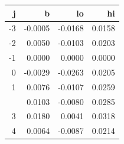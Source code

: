 
\begin{tabular}{rrrr}
\toprule
j & b & lo & hi\\
\midrule
-3 & -0.0005 & -0.0168 & 0.0158\\
-2 & 0.0050 & -0.0103 & 0.0203\\
-1 & 0.0000 & 0.0000 & 0.0000\\
0 & -0.0029 & -0.0263 & 0.0205\\
1 & 0.0076 & -0.0107 & 0.0259\\
\addlinespace
2 & 0.0103 & -0.0080 & 0.0285\\
3 & 0.0180 & 0.0041 & 0.0318\\
4 & 0.0064 & -0.0087 & 0.0214\\
\bottomrule
\end{tabular}
